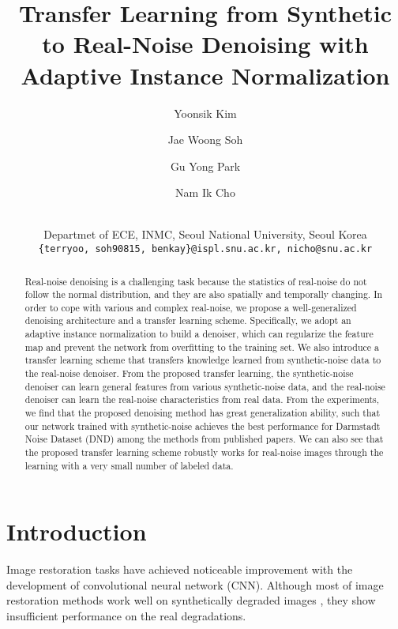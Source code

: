 \documentclass[10pt,twocolumn,letterpaper]{article}
\begin{document}
\title{Transfer Learning from Synthetic to Real-Noise Denoising with Adaptive Instance Normalization}
	
\author{Yoonsik Kim \and Jae Woong Soh  \and Gu Yong Park \and Nam Ik Cho \and
	\\Departmet of ECE, INMC, Seoul National University, Seoul Korea\\
	{\tt\small \{terryoo, soh90815, benkay\}@ispl.snu.ac.kr, nicho@snu.ac.kr} }
	


\maketitle

\maketitle
\thispagestyle{empty}

\begin{abstract}
Real-noise denoising is a challenging task because the statistics of real-noise do not follow the normal distribution, and they are also spatially and temporally changing.
In order to cope with various and complex real-noise, we propose a well-generalized denoising architecture and a transfer learning scheme.
Specifically, we adopt an adaptive instance normalization to build a denoiser, which can regularize the feature map and prevent the network from overfitting to the training set.
We also introduce a transfer learning scheme that transfers knowledge learned from synthetic-noise data to the real-noise denoiser.
From the proposed transfer learning, the synthetic-noise denoiser can learn general features from various synthetic-noise data, and the real-noise denoiser can learn the real-noise characteristics from real data.
From the experiments, we find that the proposed denoising method has great generalization ability, such that our network trained with synthetic-noise achieves the best performance for Darmstadt Noise Dataset (DND) among the methods from published papers.
We can also see that the proposed transfer learning scheme robustly works for real-noise images through the learning with a very small number of labeled data. 

\end{abstract}

\section{Introduction}
Image restoration tasks \cite{ gharbi2016deep, ledig2017photo, lehtinen2018noise2noise, lefkimmiatis2018universal, zhang2018learning, xiao2018discriminative, kokkinos2019iterative, manakov2019noise} have achieved noticeable improvement with the development of convolutional neural network (CNN).
Although most of image restoration methods work well on synthetically degraded images \cite{kim2016accurate, zhang2018image,cai2019toward,kim2019adaptively}, they show insufficient performance on the real degradations.
\end{document}
